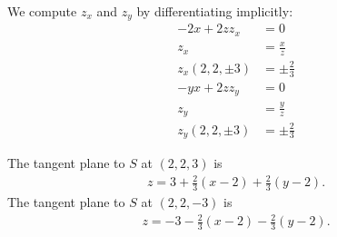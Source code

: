\documentclass{exam}
\begin{document}
\begin{questions}
    \begin{solution}
        We compute $z_x$ and $z_y$ by differentiating implicitly:
        \begin{align*}
            -2x + 2zz_x &= 0\\
            z_x &= \frac xz\\
            z_x(2,2,\pm 3) &= \pm\frac2{3}\\
            -yx + 2zz_y &= 0\\
            z_y &= \frac yz\\
            z_y(2,2,\pm 3) &= \pm\frac2{3}
        \end{align*}
        
        The tangent plane to $S$ at $(2,2,3)$ is
        \begin{align*}
            z = 3 + \frac23(x-2) + \frac23(y-2).
        \end{align*}
        The tangent plane to $S$ at $(2,2,-3)$ is
        \begin{align*}
            z = -3 - \frac23(x-2) - \frac23(y-2).
        \end{align*}
    \end{solution}
\end{questions}
\end{document}
